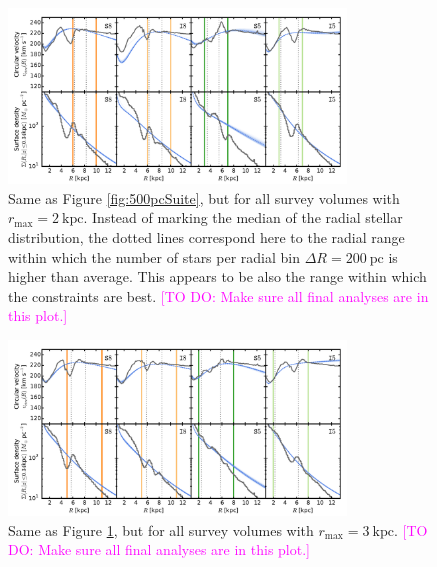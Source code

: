 \documentclass[iop,revtex4,numberedappendix,appendixfloats]{emulateapj}
\newcommand{\Wilma}[1]{\textcolor{Magenta}{#1}}
\begin{document}
\begin{appendix}
\begin{figure}[!htbp]
\centering
\includegraphics[width=0.8\textwidth]{fig/MNdHHdiffSph2_vcirc_surfdens_2kpcSuite.pdf}
\caption{Same as Figure \ref{fig:500pcSuite}, but for all survey volumes with $r_\text{max}=2~\text{kpc}$. Instead of marking the median of the radial stellar distribution, the dotted lines correspond here to the radial range within which the number of stars per radial bin $\Delta R = 200~\text{pc}$ is higher than average. This appears to be also the range within which the constraints are best. \Wilma{[TO DO: Make sure all final analyses are in this plot.]}}
\label{fig:2kpcSuite}
\end{figure}

\begin{figure}[!htbp]
\centering
\includegraphics[width=0.8\textwidth]{fig/MNdHHdiffSph2_vcirc_surfdens_3kpcSuite.pdf}
\caption{Same as Figure \ref{fig:2kpcSuite}, but for all survey volumes with $r_\text{max}=3~\text{kpc}$. \Wilma{[TO DO: Make sure all final analyses are in this plot.]}}
\label{fig:????}
\end{figure}


\end{appendix}
\end{document}
